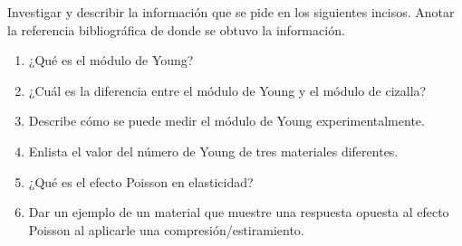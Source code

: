 \documentclass[../main.tex]{subfiles}
\begin{document}
\begin{problema}[3]
	Investigar y describir la información que se pide en los siguientes incisos.
	Anotar la referencia bibliográfica de donde se obtuvo la información.

	\begin{enumerate}
		\item ¿Qué es el módulo de Young?
		\item ¿Cuál es la diferencia entre el módulo de Young y el módulo
		      de cizalla?
		\item Describe cómo se puede medir el módulo de Young experimentalmente.
		\item Enlista el valor del número de Young de tres materiales diferentes.
		\item ¿Qué es el efecto Poisson en elasticidad?
		\item Dar un ejemplo de un material que muestre una respuesta opuesta
		      al efecto Poisson al aplicarle una compresión/estiramiento.
	\end{enumerate}
\end{problema}
\end{document}
